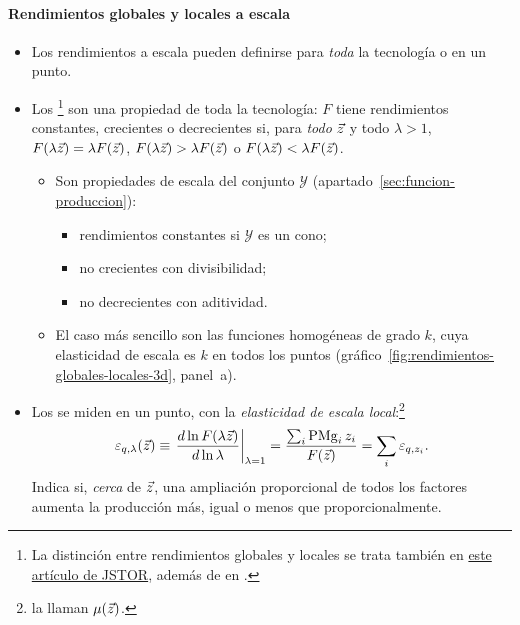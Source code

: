 \documentclass[11pt]{article}
\begin{document}
\paragraph{Rendimientos globales y locales a escala}

\begin{itemize}
\item Los rendimientos a escala pueden definirse para \emph{toda} la tecnología o en un punto\nocite{JehleReny2011Advanced}.
\item Los \footnote{La distinción entre rendimientos globales y locales se trata también en \href{https://www.jstor.org/stable/4101869}{este artículo de JSTOR}, además de en \textcite[133-134]{JehleReny2011Advanced}.} son una propiedad de toda la tecnología: $F$ tiene rendimientos constantes, crecientes o decrecientes si, para \emph{todo} $\vec{z}$ y todo $\lambda>1$, $F(\lambda\vec{z})=\lambda F(\vec{z})$, $F(\lambda\vec{z})>\lambda F(\vec{z})$ o $F(\lambda\vec{z})<\lambda F(\vec{z})$.
  \begin{itemize}
  \item Son propiedades de escala del conjunto $\mathcal{Y}$ (apartado~\ref{sec:funcion-produccion})\nocite{MasColellWhinstonGreen1995}:
    \begin{itemize}
    \item rendimientos constantes si $\mathcal{Y}$ es un cono;
    \item no crecientes con divisibilidad;
    \item no decrecientes con aditividad.
    \end{itemize}
  \item El caso más sencillo son las funciones homogéneas de grado $k$, cuya elasticidad de escala es $k$ en todos los puntos (gráfico~\ref{fig:rendimientos-globales-locales-3d}, panel~a).
  \end{itemize}
\item Los  se miden en un punto, con la \emph{elasticidad de escala local}:\footnote{\textcite[def.~3.4]{JehleReny2011Advanced} la llaman $\mu(\vec{z})$.}
  \begin{equation}
  \varepsilon_{q,\lambda}(\vec{z})\equiv\left.\frac{d\ln F(\lambda\vec{z})}{d\ln\lambda}\right|_{\lambda=1}=\frac{\sum_{i}\mathrm{PMg}_i\,z_i}{F(\vec{z})}=\sum_i\varepsilon_{q,z_i}. \label{eq:escala-local}
  \end{equation}
  Indica si, \emph{cerca} de $\vec{z}$, una ampliación proporcional de todos los factores aumenta la producción más, igual o menos que proporcionalmente.

\end{itemize}
\end{document}
